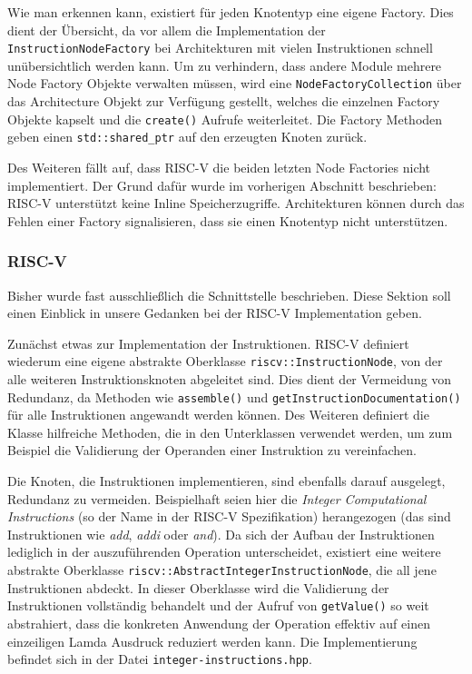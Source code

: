 Wie man erkennen kann, existiert für jeden Knotentyp eine eigene Factory. Dies
dient der Übersicht, da vor allem die Implementation der
\texttt{InstructionNodeFactory} bei Architekturen mit vielen Instruktionen
schnell unübersichtlich werden kann. Um zu verhindern, dass andere Module
mehrere Node Factory Objekte verwalten müssen, wird eine
\texttt{NodeFactoryCollection} über das Architecture Objekt zur Verfügung
gestellt, welches die einzelnen Factory Objekte kapselt und die
\texttt{create()} Aufrufe weiterleitet.
Die Factory Methoden geben einen \texttt{std::shared\_ptr} auf den erzeugten
Knoten zurück.

Des Weiteren fällt auf, dass RISC-V die beiden letzten Node Factories nicht
implementiert. Der Grund dafür wurde im vorherigen Abschnitt beschrieben:
RISC-V unterstützt keine Inline Speicherzugriffe. Architekturen können durch das
Fehlen einer Factory signalisieren, dass sie einen Knotentyp nicht unterstützen.

\subsubsection{RISC-V}

Bisher wurde fast ausschließlich die Schnittstelle beschrieben. Diese Sektion
soll einen Einblick in unsere Gedanken bei der RISC-V Implementation geben.

Zunächst etwas zur Implementation der Instruktionen. RISC-V definiert wiederum
eine eigene abstrakte Oberklasse \texttt{riscv::InstructionNode}, von der alle
weiteren Instruktionsknoten abgeleitet sind. Dies dient der Vermeidung von
Redundanz, da Methoden wie \texttt{assemble()} und
\texttt{getInstructionDocumentation()} für alle Instruktionen angewandt werden
können. Des Weiteren definiert die Klasse hilfreiche Methoden, die in den
Unterklassen verwendet werden, um zum Beispiel die Validierung der Operanden
einer Instruktion zu vereinfachen.

Die Knoten, die Instruktionen implementieren, sind ebenfalls darauf ausgelegt,
Redundanz zu vermeiden. Beispielhaft seien hier die \emph{Integer
Computational Instructions} (so der Name in der RISC-V Spezifikation)
herangezogen (das sind Instruktionen wie \emph{add}, \emph{addi} oder
\emph{and}). Da sich der Aufbau der Instruktionen lediglich in der
auszuführenden Operation unterscheidet, existiert eine weitere abstrakte
Oberklasse \texttt{riscv::AbstractIntegerInstructionNode}, die all jene
Instruktionen abdeckt. In dieser Oberklasse wird die Validierung der
Instruktionen vollständig behandelt und der Aufruf von \texttt{getValue()} so
weit abstrahiert, dass die konkreten Anwendung der Operation effektiv auf einen
einzeiligen Lamda Ausdruck reduziert werden kann. Die Implementierung befindet
sich in der Datei \texttt{integer-instructions.hpp}.

